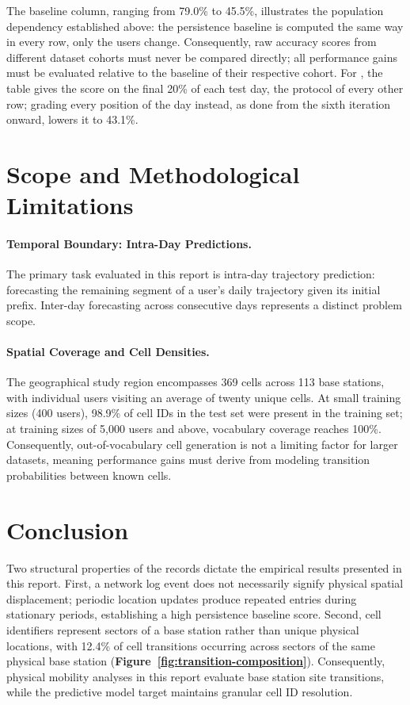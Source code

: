 

The baseline column, ranging from 79.0\% to 45.5\%, illustrates the population dependency established above: the persistence baseline is computed the same way in every row, only the users change. Consequently, raw accuracy scores from different dataset cohorts must never be compared directly; all performance gains must be evaluated relative to the baseline of their respective cohort. For \Dmob{}, the table gives the score on the final 20\% of each test day, the protocol of every other row; grading every position of the day instead, as done from the sixth iteration onward, lowers it to 43.1\%.

\section{Scope and Methodological Limitations}

\paragraph{Temporal Boundary: Intra-Day Predictions.} The primary task evaluated in this report is intra-day trajectory prediction: forecasting the remaining segment of a user's daily trajectory given its initial prefix. Inter-day forecasting across consecutive days represents a distinct problem scope.

\paragraph{Spatial Coverage and Cell Densities.} The geographical study region encompasses 369 cells across 113 base stations, with individual users visiting an average of twenty unique cells. At small training sizes (400 users), 98.9\% of cell IDs in the test set were present in the training set; at training sizes of 5,000 users and above, vocabulary coverage reaches 100\%. Consequently, out-of-vocabulary cell generation is not a limiting factor for larger datasets, meaning performance gains must derive from modeling transition probabilities between known cells.

\section{Conclusion}
\label{sec:retro-data}

Two structural properties of the records dictate the empirical results presented in this report. First, a network log event does not necessarily signify physical spatial displacement; periodic location updates produce repeated entries during stationary periods, establishing a high persistence baseline score. Second, cell identifiers represent sectors of a base station rather than unique physical locations, with 12.4\% of cell transitions occurring across sectors of the same physical base station (\textbf{Figure~\ref{fig:transition-composition}}). Consequently, physical mobility analyses in this report evaluate base station site transitions, while the predictive model target maintains granular cell ID resolution.


